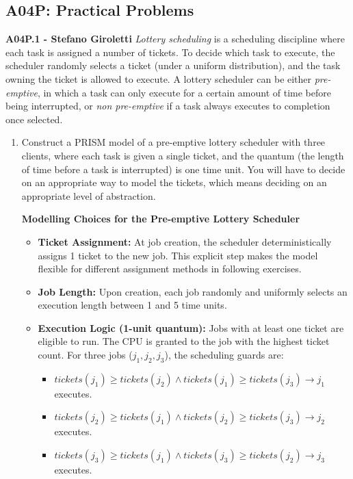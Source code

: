 \documentclass[12pt,a4paper]{article}
\begin{document}
\subsection*{A04P: Practical Problems}
\begin{description}
\item{\bf A04P.1 - Stefano Giroletti} \emph{Lottery scheduling} is a scheduling discipline where each task is assigned a number of tickets. To decide which task
to execute, the scheduler randomly selects a ticket (under a uniform distribution), and the task owning the ticket is allowed to
execute. A lottery scheduler can be either \emph{pre-emptive}, in which a task can only execute for a certain amount of time
before being interrupted, or \emph{non pre-emptive} if a task always executes to completion once selected.
\begin{enumerate}[label=\alph*)]
\item Construct a PRISM model of a pre-emptive lottery scheduler with three clients, where each task is given a single ticket, and the
quantum (the length of time before a task is interrupted) is one time unit. You will have to decide on an appropriate way to model the
tickets, which means deciding on an appropriate level of abstraction.
%
\ifwithanswers
\color{blue}
\par
\textbf{Modelling Choices for the Pre-emptive Lottery Scheduler}
\begin{itemize}
    \item \textbf{Ticket Assignment:} At job creation, the scheduler deterministically assigns 1 ticket to the new job. This explicit step makes the model flexible for different assignment methods in following exercises.
    \item \textbf{Job Length:} Upon creation, each job randomly and uniformly selects an execution length between 1 and 5 time units.
    \item \textbf{Execution Logic (1-unit quantum):} Jobs with at least one ticket are eligible to run. The CPU is granted to the job with the highest ticket count. For three jobs ($j_1, j_2, j_3$), the scheduling guards are:
    \begin{itemize}
        \item $tickets(j_1) \geq tickets(j_2) \land tickets(j_1) \geq tickets(j_3) \rightarrow j_1$ executes.
        \item $tickets(j_2) \geq tickets(j_1) \land tickets(j_2) \geq tickets(j_3) \rightarrow j_2$ executes.
        \item $tickets(j_3) \geq tickets(j_1) \land tickets(j_3) \geq tickets(j_2) \rightarrow j_3$ executes.

\end{itemize}
\end{itemize}
\end{enumerate}
\end{description}
\end{document}
